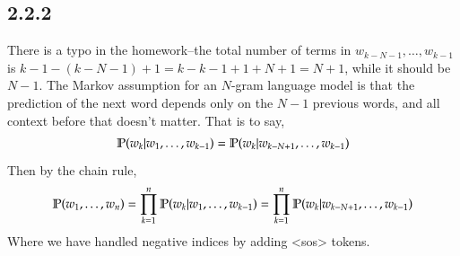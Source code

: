 \documentclass[12pt]{article}
\theoremstyle{definitionstyle}
\renewcommand{\P}{\mathbb P\qty}
\begin{document}
    \subsection*{2.2.2}
    There is a typo in the homework--the total number of terms in $w_{k-N-1}, \ldots, w_{k-1}$ is $k - 1 - (k - N - 1) + 1 = k - k - 1 + 1 + N + 1 = N + 1$, while it should be $N-1$.
    The Markov assumption for an $N$-gram language model is that the prediction of the next word depends only on the $N-1$ previous words, and all context before that doesn't matter. That is to say,
    \begin{align*}
        \P(w_k | w_1, \ldots, w_{k-1}) = \P(w_k | w_{k-N+1}, \ldots, w_{k-1})
    \end{align*}
    Then by the chain rule,
    \begin{align*}
        \P(w_1, \ldots, w_n) = \prod_{k=1}^n \P(w_k | w_1, \ldots, w_{k-1}) = \prod_{k=1}^n \P(w_k | w_{k-N+1}, \ldots, w_{k-1})
    \end{align*}
    Where we have handled negative indices by adding <sos> tokens. 
\end{document}
